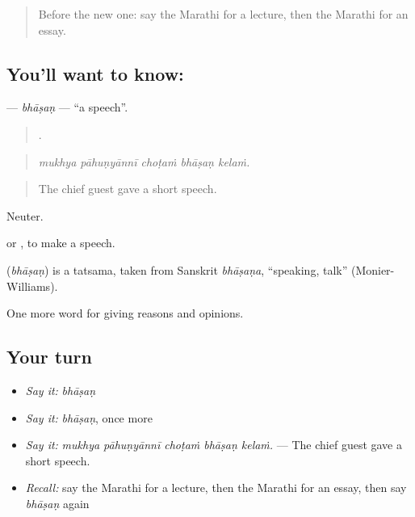 \label{lesson:MR-C370-bhasan}



\begin{quote}
Before the new one: say the Marathi for a lecture, then the Marathi for an essay.
\end{quote}

\subsection*{You'll want to know: }
\textbf{} — \emph{bhāṣaṇ} — \textquotedblleft{}a speech\textquotedblright{}.

\begin{quote}
    .
\end{quote}

\begin{quote}
\emph{mukhya pāhuṇyānnī choṭaṁ bhāṣaṇ kelaṁ.}
\end{quote}

\begin{quote}
The chief guest gave a short speech.
\end{quote}

Neuter.

  or , to make a speech.

\begin{cousinweb}
\textbf{} (\emph{bhāṣaṇ}) is a tatsama, taken from Sanskrit \emph{bhāṣaṇa}, \textquotedblleft{}speaking, talk\textquotedblright{} (Monier-Williams).
\end{cousinweb}

\begin{grammarlens}[title={What you've built}]
One more word for giving reasons and opinions.
\end{grammarlens}

\subsection*{Your turn}
\begin{itemize}
\raggedright
  \item \emph{Say it:} \emph{bhāṣaṇ}
  \item \emph{Say it:} \emph{bhāṣaṇ}, once more
  \item \emph{Say it:} \emph{mukhya pāhuṇyānnī choṭaṁ bhāṣaṇ kelaṁ.} — The chief guest gave a short speech.
  \item \emph{Recall:} say the Marathi for a lecture, then the Marathi for an essay, then say \emph{bhāṣaṇ} again
\end{itemize}

